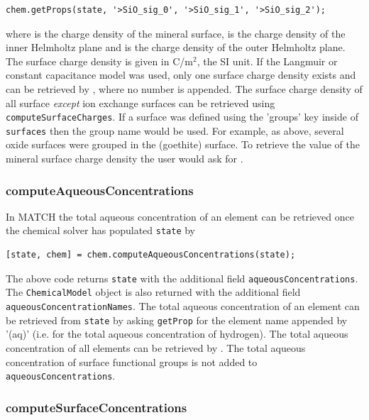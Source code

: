 \documentclass{article}
\begin{document}
\begin{lstlisting}
chem.getProps(state, '>SiO_sig_0', '>SiO_sig_1', '>SiO_sig_2');
\end{lstlisting}
where  is the charge density of the mineral surface,  is the charge density of the inner Helmholtz plane and  is the charge density of the outer Helmholtz plane. The surface charge density is given in C/m$^2$, the SI unit. If the Langmuir or constant capacitance model was used, only one surface charge density exists and can be retrieved by , where no number is appended. The surface charge density of all surface \emph{except} ion exchange surfaces can be retrieved using \verb|computeSurfaceCharges|. If a surface was defined using the 'groups' key inside of \verb|surfaces| then the group name would be used. For example, as above, several oxide surfaces were grouped in the  (goethite) surface. To retrieve the value of the mineral surface charge density the user would ask for .

\subsubsection{computeAqueousConcentrations}

In MATCH the total aqueous concentration of an element can be retrieved once the chemical solver has populated \verb|state| by

\begin{lstlisting}
[state, chem] = chem.computeAqueousConcentrations(state);
\end{lstlisting}
The above code returns \verb|state| with the additional field \verb|aqueousConcentrations|. The \verb|ChemicalModel| object is also returned with the additional field \verb|aqueousConcentrationNames|. The total aqueous concentration of an element can be retrieved from \verb|state| by asking \verb|getProp| for the element name appended by '(aq)' (i.e.  for the total aqueous concentration of hydrogen). The total aqueous concentration of all elements can be retrieved by . The total aqueous concentration of surface functional groups is not added to \verb|aqueousConcentrations|.

\subsubsection{computeSurfaceConcentrations}
\end{document}
